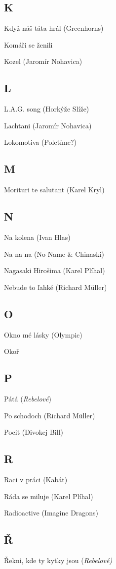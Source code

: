 \begin{multicols}{2}
\subsection*{K}
Když náš táta hrál (Greenhorns)

Komáři se ženili

Kozel (Jaromír Nohavica)

\subsection*{L}
L.A.G. song (Horkýže Slíže)

Lachtani (Jaromír Nohavica)

Lokomotiva (Poletíme?)

\subsection*{M}
Morituri te salutant (Karel Kryl)

\subsection*{N}
Na kolena (Ivan Hlas)

Na na na (No Name \& Chinaski)

Nagasaki Hirošima (Karel Plíhal)

Nebude to ľahké (Richard Müller)

\subsection*{O}
Okno mé lásky (Olympic)

Okoř

\subsection*{P}
Pátá (\emph{Rebelové})

Po schodoch (Richard Müller)

Pocit (Divokej Bill)

\subsection*{R}
Raci v práci (Kabát)

Ráda se miluje (Karel Plíhal)

Radioactive (Imagine Dragons)

\subsection*{Ř}
Řekni, kde ty kytky jsou (\emph{Rebelové)}


\end{multicols}


